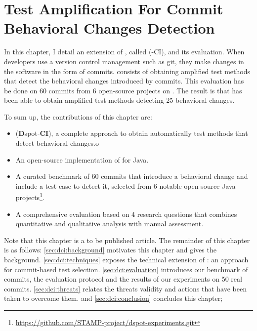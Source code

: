 \chapter{Test Amplification For Commit Behavioral Changes Detection}
\label{chap:dci}


\begin{chaptersummary}
	In this chapter, I detail an extension of \dspot, called \DCI(\dspot-CI), and its evaluation.
	When developers use a version control management such as git, they make changes in the software in the form of commits.
	\DCI consists of obtaining amplified test methods that detect the behavioral changes introduced by commits.
	This evaluation has be done on 60 commits from 6 open-source projects on \gh.
	The result is that \DCI has been able to obtain amplified test methods detecting 25 behavioral changes.
	
	To sum up, the contributions of this chapter are:
	\begin{itemize}
		\item \DCI (\textbf{D}spot-\textbf{CI}), a complete approach to obtain automatically test methods that detect behavioral changes.o
		\item An open-source implementation of \DCI for Java.
		\item A curated benchmark of 60 commits that introduce a behavioral change and include a test case to detect it, selected from 6 notable open source Java projects\footnote{\url{https://github.com/STAMP-project/dspot-experiments.git}}.
		\item A comprehensive evaluation based on 4 research questions that combines quantitative and qualitative analysis with manual assessment.
	\end{itemize}
	Note that this chapter is a to be published article\cite{DBLP:journals/corr/abs-1902-08482}.
	The remainder of this chapter is as follows:
	\autoref{sec:dci:background} motivates this chapter and gives the background.
	\autoref{sec:dci:techniques} exposes the technical extension of \dspot: an approach for commit-based test selection. 
	\autoref{sec:dci:evaluation} introduces our benchmark of commits, the evaluation protocol and the results of our experiments on 50 real commits. 
	\autoref{sec:dci:threats} relates the threats validity and actions that have been taken to overcome them. 
	and \autoref{sec:dci:conclusion} concludes this chapter;
\end{chaptersummary}

\graphicspath{{.}{chapitres/behavioral-change-detection-for-commit/}}

